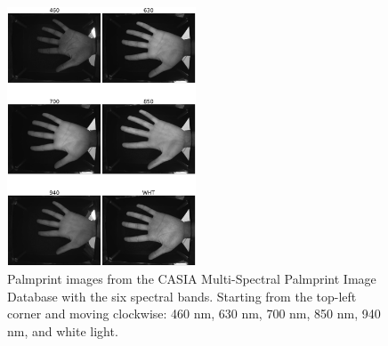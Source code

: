 \begin{figure}[H]
    \centering
    \includegraphics[width=0.5\textwidth]{./images/spectrums.png}
    \caption{Palmprint images from the CASIA Multi-Spectral Palmprint Image Database with the six spectral bands. Starting from the top-left corner and moving clockwise: 460 nm, 630 nm, 700 nm, 850 nm, 940 nm, and white light.}
    \label{fig:dataset_example}
\end{figure}